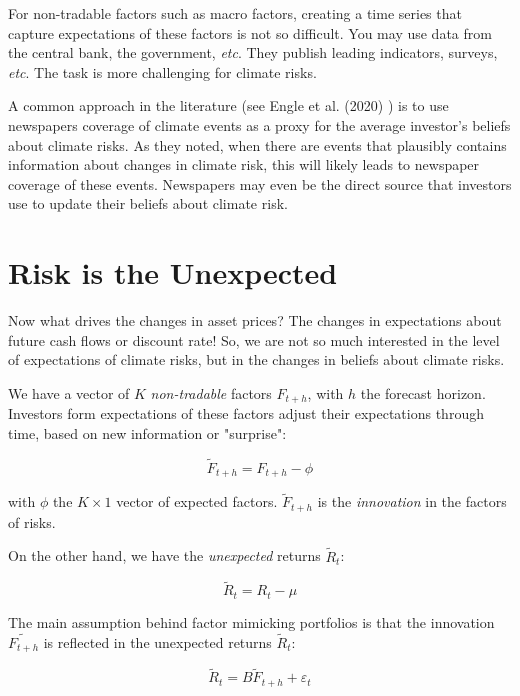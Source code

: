 For non-tradable factors such as macro factors, 
creating a time series that capture expectations 
of these factors is not so difficult. You may 
use data from the central bank, the government,
\textit{etc}. They publish leading indicators,
surveys, \textit{etc}. The task is more 
challenging for climate risks.

A common approach in the literature (see Engle et al. (2020) \cite{engle2020hedging})
is to use newspapers coverage of climate events as a proxy 
for the average investor's beliefs about climate risks.
As they noted, when there are events that plausibly
contains information about changes in climate risk,
this will likely leads to newspaper coverage of these events.
Newspapers may even be the direct source that investors
use to update their beliefs about climate risk.

\section{Risk is the Unexpected}

Now what drives the changes in asset prices?
The changes in expectations about 
future cash flows or discount rate! So,
we are not so much interested in the level of
expectations of climate risks, but in the changes
in beliefs about climate risks.


We have a vector of $K$ \textit{non-tradable} factors $F_{t+h}$, with $h$ the 
forecast horizon. 
Investors form expectations of these factors 
adjust their expectations through time, based on new information or 
"surprise":

\begin{equation}
    \tilde{F}_{t+h} = F_{t+h} - \phi
\end{equation}

with $\phi$ the $K \times 1$ vector of expected factors.
$\tilde{F}_{t+h}$ is the \textit{innovation} in the factors of risks.



On the other hand, we have the \textit{unexpected} returns $\tilde{R}_t$:

\begin{equation}
    \tilde{R}_t = R_t - \mu
\end{equation}

The main assumption behind factor mimicking portfolios is that the innovation 
$\tilde{F_{t+h}}$ is reflected in the unexpected returns $\tilde{R}_t$:

\begin{equation}
    \tilde{R}_t = B \tilde{F}_{t+h} + \varepsilon_t
\end{equation}
    
